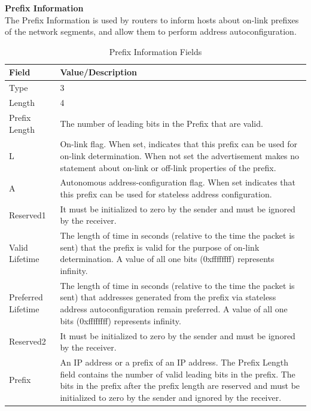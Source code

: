 \documentclass[12pt]{article}
\begin{document}
\textbf{Prefix Information}\\

The Prefix Information is used by routers to inform hosts about on-link prefixes of the network segments, and allow them to perform address autoconfiguration.\\

\begin{savenotes}
\begin{table}[!htpb]
\centering
\addtolength{\tabcolsep}{3pt}
\begin{tabular}{|L{3.0cm}|L{12.0cm}|}
\hline
Field&Value/Description\\
\hline
Type&3\\
\hline
Length&4\\
\hline
Prefix Length&The number of leading bits in the Prefix that are valid.\\
\hline
L&On-link flag. When set, indicates that this prefix can be used for on-link determination. When not set the advertisement makes no statement about on-link or off-link properties of the prefix.\\
\hline
A&Autonomous address-configuration flag. When set indicates that this prefix can be used for stateless address configuration.\\
\hline
Reserved1&It must be initialized to zero by the sender and must be ignored by the receiver.\\
\hline
Valid Lifetime&The length of time in seconds (relative to the time the packet is sent) that the prefix is valid for the purpose of on-link determination. A value of all one bits (0xffffffff) represents infinity.\\
\hline
Preferred Lifetime&The length of time in seconds (relative to the time the packet is sent) that addresses generated from the prefix via stateless address autoconfiguration remain preferred. A value of all one bits 
(0xffffffff) represents infinity.\\
\hline
Reserved2&It must be initialized to zero by the sender and must be ignored by the receiver.\\
\hline
Prefix&An IP address or a prefix of an IP address. The Prefix Length field contains the number of valid leading bits in the prefix. The bits in the prefix after the prefix length are reserved and must be initialized to 
zero by the sender and ignored by the receiver.\\
\hline
\end{tabular}
\caption{Prefix Information Fields}
\label{table:prefixInfo}
\end{table}
\end{savenotes}
\end{document}
